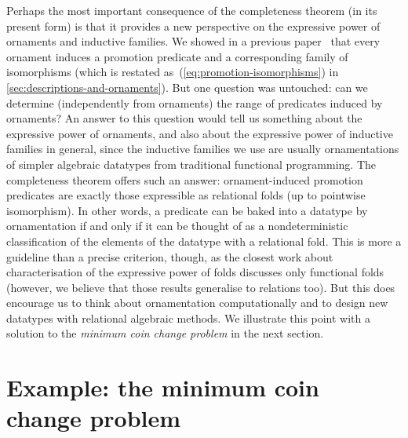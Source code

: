 Perhaps the most important consequence of the completeness theorem (in its present form) is that it provides a new perspective on the expressive power of ornaments and inductive families.
We showed in a previous paper~\cite{Ko-pcOrn} that every ornament induces a promotion predicate and a corresponding family of isomorphisms (which is restated as~(\ref{eq:promotion-isomorphisms}) in \autoref{sec:descriptions-and-ornaments}).
But one question was untouched: can we determine (independently from ornaments) the range of predicates induced by ornaments?
An answer to this question would tell us something about the expressive power of ornaments, and also about the expressive power of inductive families in general, since the inductive families we use are usually ornamentations of simpler algebraic datatypes from traditional functional programming.
The completeness theorem offers such an answer: ornament-induced promotion predicates are exactly those expressible as relational folds (up to pointwise isomorphism).
In other words, a predicate can be baked into a datatype by ornamentation if and only if it can be thought of as a nondeterministic classification of the elements of the datatype with a relational fold.
This is more a guideline than a precise criterion, though, as the closest work about characterisation of the expressive power of folds discusses only functional folds~\cite{Gibbons-kernels}
(however, we believe that those results generalise to relations too).
But this does encourage us to think about ornamentation computationally and to design new datatypes with relational algebraic methods.
We illustrate this point with a solution to the \emph{minimum coin change problem} in the next section.

\section{Example: the minimum coin change problem}
\label{sec:minimum-coin-change}

